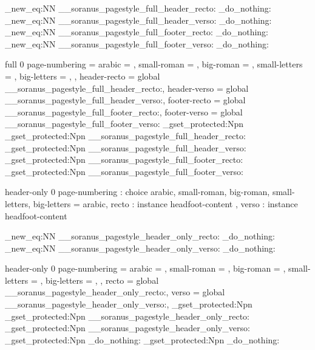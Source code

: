 \cs_new_eq:NN \__soranus_pagestyle_full_header_recto: \prg_do_nothing:
\cs_new_eq:NN \__soranus_pagestyle_full_header_verso: \prg_do_nothing:
\cs_new_eq:NN \__soranus_pagestyle_full_footer_recto: \prg_do_nothing:
\cs_new_eq:NN \__soranus_pagestyle_full_footer_verso: \prg_do_nothing:

 { full } { 0 }
  {
    page-numbering =
      {
        arabic        = ,
        small-roman   = ,
        big-roman     = ,
        small-letters = ,
        big-letters   = ,
      },
      header-recto = global \__soranus_pagestyle_full_header_recto:,
      header-verso = global \__soranus_pagestyle_full_header_verso:,
      footer-recto = global \__soranus_pagestyle_full_footer_recto:,
      footer-verso = global \__soranus_pagestyle_full_footer_verso:
  }
  {
    \AssignTemplateKeys
    \cs_gset_protected:Npn \@mkboth { \markboth }
    \cs_gset_protected:Npn \@oddhead
      { \__soranus_pagestyle_full_header_recto: }
    \cs_gset_protected:Npn \@evenhead
      { \__soranus_pagestyle_full_header_verso: }
    \cs_gset_protected:Npn \@oddfoot
      { \__soranus_pagestyle_full_footer_recto: }
    \cs_gset_protected:Npn \@evenfoot
      { \__soranus_pagestyle_full_footer_verso: }
  }


%

 { header-only } { 0 }
  {
    page-numbering : choice
      { arabic, small-roman, big-roman, small-letters, big-letters }
                                         = arabic,
    recto          : instance { headfoot-content },
    verso          : instance { headfoot-content }
  }

\cs_new_eq:NN \__soranus_pagestyle_header_only_recto: \prg_do_nothing:
\cs_new_eq:NN \__soranus_pagestyle_header_only_verso: \prg_do_nothing:

 { header-only } { 0 }
  {
    page-numbering =
      {
        arabic        = ,
        small-roman   = ,
        big-roman     = ,
        small-letters = ,
        big-letters   = ,
      },
      recto        = global \__soranus_pagestyle_header_only_recto:,
      verso        = global \__soranus_pagestyle_header_only_verso:,
  }
  {
    \AssignTemplateKeys
    \cs_gset_protected:Npn \@mkboth { \markboth }
    \cs_gset_protected:Npn \@oddhead
      { \__soranus_pagestyle_header_only_recto: }
    \cs_gset_protected:Npn \@evenhead
      { \__soranus_pagestyle_header_only_verso: }
    \cs_gset_protected:Npn \@oddfoot
      { \prg_do_nothing: }
    \cs_gset_protected:Npn \@evenfoot
      { \prg_do_nothing: }
  }


